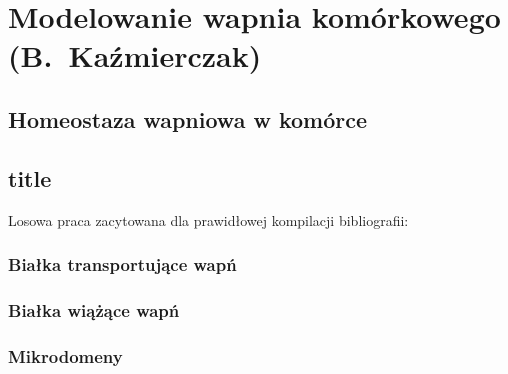 \chapter{Modelowanie wapnia komórkowego (B.~Kaźmierczak)}

\section{Homeostaza wapniowa w komórce}

\section{title}


Losowa praca zacytowana dla prawidłowej kompilacji bibliografii: \cite{Abu-Hamad2009}

\subsection{Białka transportujące wapń}

\subsection{Białka wiążące wapń}

\subsection{Mikrodomeny}